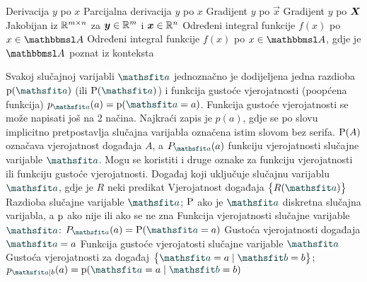  				{Derivacija $y$ po $x$}
 				{Parcijalna derivacija $y$ po $x$}
 	{Gradijent $y$ po $\vec x$}
	{Gradijent $y$ po $\mat X$}
 	{Jakobijan iz $\R^{m\times n}$ za $\vec y\in\R^m$ i $\vec x\in\R^n$}
 {Određeni integral funkcije $f(x)$ po $x\in\set A$}
 {Određeni integral funkcije $f(x)$ po $x\in\set A$, gdje je $\set A$ poznat iz konteksta}

{Svakoj slučajnoj varijabli $\rvar a$ jednoznačno je dodijeljena jedna razdioba $\p(\rvar a)$ (ili $\P(\rvar a)$) i funkcija gustoće vjerojatnosti (poopćena funkcija) $p_{\rvar a}(a)=\p(\rvar a=a)$. Funkcija gustoće vjerojatnosti se može napisati još na 2 načina. Najkraći zapis je $p(a)$, gdje se po slovu implicitno pretpostavlja slučajna varijabla označena istim slovom bez serifa. $\P(A)$ označava vjerojatnost događaja $A$, a $P_{\rvar a}(a)$ funkciju vjerojatnosti slučajne varijable $\rvar a$. Mogu se koristiti i druge oznake za funkciju vjerojatnosti ili funkciju gustoće vjerojatnosti.}
 {Događaj koji uključuje slučajnu varijablu $\rvar a$, gdje je $R$ neki predikat}
 {Vjerojatnost događaja $\cbr{R(\rvar a)}$}
 {Razdioba slučajne varijable $\rvar a$; $\P$ ako je $\rvar a$ diskretna slučajna varijabla, a $\p$ ako nije ili ako se ne zna}
 {Funkcija vjerojatnosti slučajne varijable $\rvar a$: $P_{\rvar a}(a)=\P(\rvar a= a)$}
 {Gustoća vjerojatnosti događaja $\rvar a=a$}
 {Funkcija gustoće vjerojatosti slučajne varijable $\rvar a$}
 {Gustoća vjerojatnosti za događaj $\cbr{\rvar a= a\mid\rvar b= b}$; $p_{\rvar a\mid b}(a)=\p(\rvar a= a\mid\rvar b= b)$}
